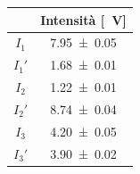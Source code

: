\documentclass[10pt,oneside,a4paper]{article}
\begin{document}
\hspace{1em}
\begin{minipage}[t]{.33\linewidth}
\begin{center}
\label{tab:stokesHeNe}
\begin{tabular}{c|c}
& Intensità [\SI{}{V}]  \\
\hline
     $I_1$  &        \SI{7.95 \pm 0.05}{} \\
     $I_1'$  &       \SI{1.68 \pm 0.01}{} \\
     \hline 
     $I_2$  &        \SI{1.22 \pm 0.01}{} \\
     $I_2'$  &       \SI{8.74 \pm 0.04}{} \\
     \hline 
     $I_3$  &        \SI{4.20 \pm 0.05}{} \\
     $I_3'$	&		 \SI{3.90 \pm 0.02}{} \\
\hline
\end{tabular}
\end{center}
\end{minipage}
\newline

\vspace{2cm}
\end{document}
